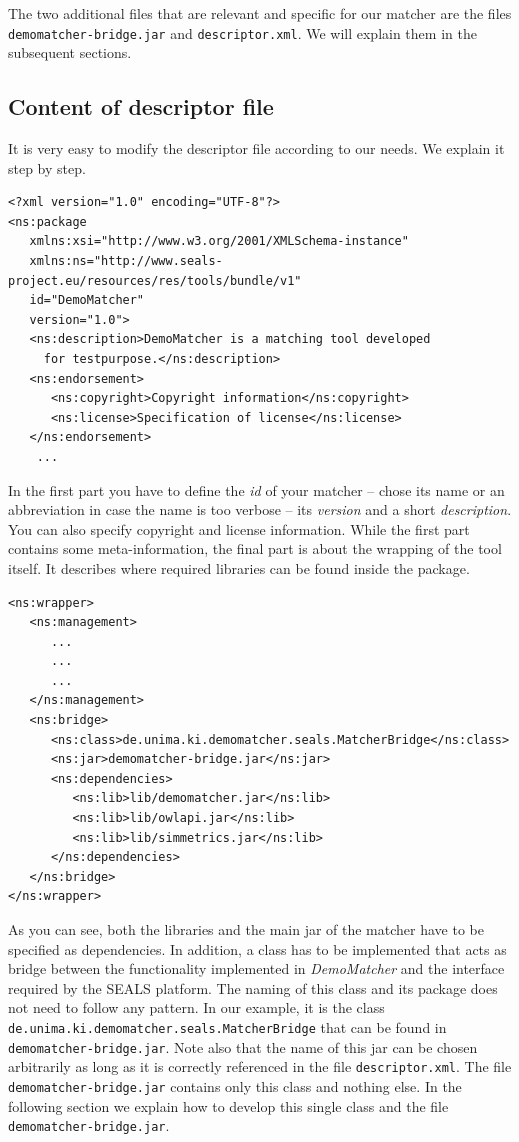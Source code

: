 \documentclass{article}
\def\file#1{\textcolor{grayy}{\texttt{#1}}}
\def\tool#1{\textsl{#1}}
\begin{document}
The two additional files that are relevant and specific for our matcher are the files \file{demomatcher-bridge.jar} and \file{descriptor.xml}. We will explain them in the subsequent sections.

\subsection{Content of descriptor file}
\label{sec:descriptor}

It is very easy to modify the descriptor file according to our needs. We explain it step by step.
\begin{verbatim}
<?xml version="1.0" encoding="UTF-8"?>
<ns:package 	  
   xmlns:xsi="http://www.w3.org/2001/XMLSchema-instance" 
   xmlns:ns="http://www.seals-project.eu/resources/res/tools/bundle/v1"
   id="DemoMatcher" 
   version="1.0">
   <ns:description>DemoMatcher is a matching tool developed
     for testpurpose.</ns:description>
   <ns:endorsement>
      <ns:copyright>Copyright information</ns:copyright>
      <ns:license>Specification of license</ns:license>
   </ns:endorsement>
	...
\end{verbatim}
In the first part you have to define the \emph{id} of your matcher -- chose its name or an abbreviation in case the name is too verbose -- its \emph{version} and a short \emph{description}. You can also specify copyright and license information. While the first part contains some meta-information, the final part is about the wrapping of the tool itself. It describes where required libraries can be found inside the package.
\begin{verbatim}
<ns:wrapper>
   <ns:management>
      ...
      ...
      ...
   </ns:management>
   <ns:bridge>
      <ns:class>de.unima.ki.demomatcher.seals.MatcherBridge</ns:class>
      <ns:jar>demomatcher-bridge.jar</ns:jar>
      <ns:dependencies>
         <ns:lib>lib/demomatcher.jar</ns:lib>
         <ns:lib>lib/owlapi.jar</ns:lib>
         <ns:lib>lib/simmetrics.jar</ns:lib>
      </ns:dependencies>
   </ns:bridge>
</ns:wrapper>
\end{verbatim}
As you can see, both the libraries and the main jar of the matcher have to be specified as dependencies. In addition, a class has to be implemented that acts as bridge between the functionality implemented in \tool{DemoMatcher} and the interface required by the SEALS platform. The naming of this class and its package does not need to follow any pattern. In our example, it is the class \verb|de.unima.ki.demomatcher.seals.MatcherBridge| that can be found in \file{demomatcher-bridge.jar}. Note also that the name of this jar can be chosen arbitrarily as long as it is correctly referenced in the file \file{descriptor.xml}.  The file \file{demomatcher-bridge.jar} contains only this class and nothing else. In the following section we explain how to develop this single class and the file \file{demomatcher-bridge.jar}.
\end{document}
